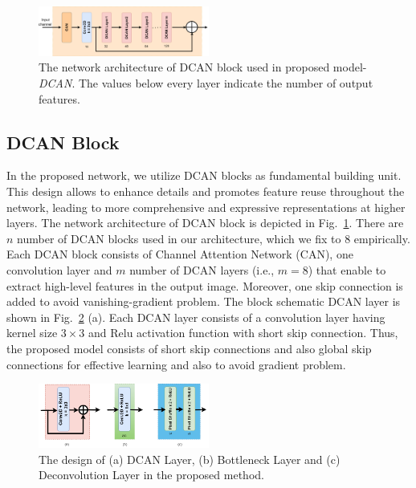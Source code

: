 \documentclass[conference]{IEEEtran}
\begin{document}
\begin{figure}[h!]
    \centering
    \includegraphics[width=0.5\textwidth]{2.drawio (4).png} %
    \caption{The network architecture of DCAN block used in proposed model-\emph{DCAN}. The values below every layer indicate the number of output features.}
    \label{fig:label6.9}
\end{figure}
\subsection{DCAN Block}
In the proposed network, we utilize DCAN blocks as fundamental building unit. This design allows to enhance details and promotes feature reuse throughout the network, leading to more comprehensive and expressive representations at higher layers. The network architecture of DCAN block is depicted in Fig.~\ref{fig:label6.9}. There are $n$ number of DCAN blocks used in our architecture, which we fix to $8$ empirically. Each DCAN block consists of Channel Attention Network (CAN), one convolution layer and $m$ number of DCAN layers (i.e., $m=8$) that enable to extract high-level features in the output image. Moreover, one skip connection is added to avoid vanishing-gradient problem. The block schematic DCAN layer is shown in Fig.~\ref{fig:label6.10} (a). Each DCAN layer consists of a convolution layer having kernel size $3\times3$ and Relu activation function with short skip connection. Thus, the proposed model consists of short skip connections and also global skip connections for effective learning and also to avoid gradient problem. 



\begin{figure}[h!]
    \centering
    \includegraphics[width=0.5\textwidth]{fi.drawio (2).png} %
    \caption{The design of (a) DCAN Layer, (b) Bottleneck Layer and (c) Deconvolution Layer in the proposed method.}
    \label{fig:label6.10}
\end{figure}
\end{document}
